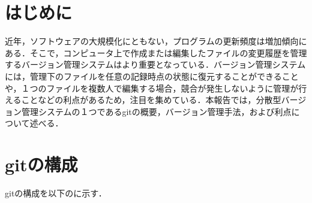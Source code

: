 \documentclass[a4j,9pt,twocolumn]{jsarticle}
\begin{document}


\section{はじめに}
近年，ソフトウェアの大規模化にともない，プログラムの更新頻度は増加傾向にある．そこで，コンピュータ上で作成または編集したファイルの変更履歴を管理するバージョン管理システムはより重要となっている．バージョン管理システムには，管理下のファイルを任意の記録時点の状態に復元することができることや，１つのファイルを複数人で編集する場合，競合が発生しないように管理が行えることなどの利点があるため，注目を集めている\cite{pop}．本報告では，分散型バージョン管理システムの１つであるgitの概要，バージョン管理手法，および利点について述べる．

\section{gitの構成}
gitの構成を以下のに示す．
\end{document}
